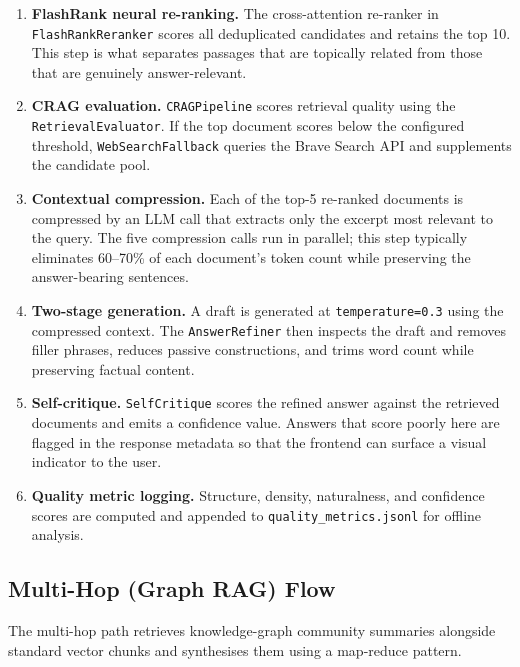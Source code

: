 \begin{enumerate}
    \item \textbf{FlashRank neural re-ranking.} The cross-attention re-ranker
    in \texttt{FlashRankReranker} scores all deduplicated candidates and
    retains the top 10. This step is what separates passages that are
    topically related from those that are genuinely answer-relevant.

    \item \textbf{CRAG evaluation.} \texttt{CRAGPipeline} scores retrieval
    quality using the \texttt{RetrievalEvaluator}. If the top document scores
    below the configured threshold, \texttt{WebSearchFallback} queries the
    Brave Search API and supplements the candidate pool.

    \item \textbf{Contextual compression.} Each of the top-5 re-ranked
    documents is compressed by an LLM call that extracts only the excerpt
    most relevant to the query. The five compression calls run in parallel;
    this step typically eliminates 60--70\% of each document's token count
    while preserving the answer-bearing sentences.

    \item \textbf{Two-stage generation.} A draft is generated at
    \texttt{temperature=0.3} using the compressed context. The
    \texttt{AnswerRefiner} then inspects the draft and removes filler phrases,
    reduces passive constructions, and trims word count while preserving
    factual content.

    \item \textbf{Self-critique.} \texttt{SelfCritique} scores the refined
    answer against the retrieved documents and emits a confidence value.
    Answers that score poorly here are flagged in the response metadata so
    that the frontend can surface a visual indicator to the user.

    \item \textbf{Quality metric logging.} Structure, density, naturalness,
    and confidence scores are computed and appended to
    \texttt{quality\_metrics.jsonl} for offline analysis.
\end{enumerate}

\subsection{Multi-Hop (Graph RAG) Flow}

The multi-hop path retrieves knowledge-graph community summaries alongside
standard vector chunks and synthesises them using a map-reduce pattern.

